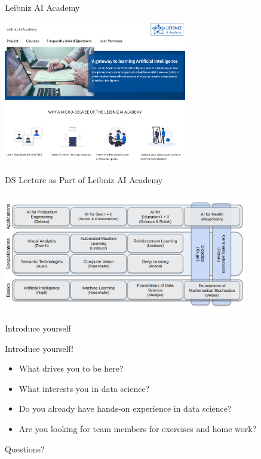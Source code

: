 \documentclass[aspectratio=169,handout]{../latex_main/tntbeamer}  %
\begin{document}
\begin{frame}[c]{Leibniz AI Academy}

\centering
\includegraphics[width=0.6\textwidth]{figures/leibniz_ai_academy.png}

\end{frame}
\begin{frame}[c]{DS Lecture as Part of Leibniz AI Academy}

\centering
\includegraphics[width=0.8\textwidth]{figures/LAI-New-Blue.png}

\end{frame}
\begin{frame}[c]{Introduce yourself}


\begin{center}
\huge
    Introduce yourself!
\end{center}

\begin{itemize}
    \item What drives you to be here?
    \item What interests you in data science?
    \item Do you already have hands-on experience in data science?
    \item Are you looking for team members for exercises and home work?
\end{itemize}

\end{frame}


\begin{frame}[c]{}

\centering
\huge
Questions?

\end{frame}

	
\end{document}
